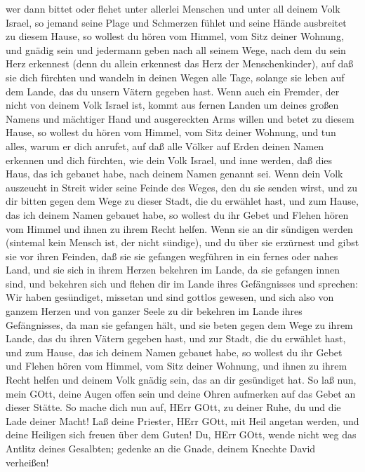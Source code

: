  wer dann bittet oder flehet unter allerlei Menschen und
unter all deinem Volk Israel, so jemand seine Plage und Schmerzen fühlet
und seine Hände ausbreitet zu diesem Hause,  so wollest du
hören vom Himmel, vom Sitz deiner Wohnung, und gnädig sein und jedermann
geben nach all seinem Wege, nach dem du sein Herz erkennest (denn du
allein erkennest das Herz der Menschenkinder),  auf daß sie
dich fürchten und wandeln in deinen Wegen alle Tage, solange sie leben
auf dem Lande, das du unsern Vätern gegeben hast.  Wenn
auch ein Fremder, der nicht von deinem Volk Israel ist, kommt aus fernen
Landen um deines großen Namens und mächtiger Hand und ausgereckten Arms
willen und betet zu diesem Hause,  so wollest du hören vom
Himmel, vom Sitz deiner Wohnung, und tun alles, warum er dich anrufet,
auf daß alle Völker auf Erden deinen Namen erkennen und dich fürchten,
wie dein Volk Israel, und inne werden, daß dies Haus, das ich gebauet
habe, nach deinem Namen genannt sei.  Wenn dein Volk
auszeucht in Streit wider seine Feinde des Weges, den du sie senden
wirst, und zu dir bitten gegen dem Wege zu dieser Stadt, die du erwählet
hast, und zum Hause, das ich deinem Namen gebauet habe,  so
wollest du ihr Gebet und Flehen hören vom Himmel und ihnen zu ihrem
Recht helfen.  Wenn sie an dir sündigen werden (sintemal
kein Mensch ist, der nicht sündige), und du über sie erzürnest und gibst
sie vor ihren Feinden, daß sie sie gefangen wegführen in ein fernes oder
nahes Land,  und sie sich in ihrem Herzen bekehren im
Lande, da sie gefangen innen sind, und bekehren sich und flehen dir im
Lande ihres Gefängnisses und sprechen: Wir haben gesündiget, missetan
und sind gottlos gewesen,  und sich also von ganzem Herzen
und von ganzer Seele zu dir bekehren im Lande ihres Gefängnisses, da man
sie gefangen hält, und sie beten gegen dem Wege zu ihrem Lande, das du
ihren Vätern gegeben hast, und zur Stadt, die du erwählet hast, und zum
Hause, das ich deinem Namen gebauet habe,  so wollest du
ihr Gebet und Flehen hören vom Himmel, vom Sitz deiner Wohnung, und
ihnen zu ihrem Recht helfen und deinem Volk gnädig sein, das an dir
gesündiget hat.  So laß nun, mein GOtt, deine Augen offen
sein und deine Ohren aufmerken auf das Gebet an dieser Stätte.
 So mache dich nun auf, HErr GOtt, zu deiner Ruhe, du und
die Lade deiner Macht! Laß deine Priester, HErr GOtt, mit Heil angetan
werden, und deine Heiligen sich freuen über dem Guten!  Du,
HErr GOtt, wende nicht weg das Antlitz deines Gesalbten; gedenke an die
Gnade, deinem Knechte David verheißen!

